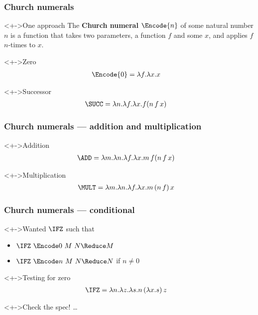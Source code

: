 \documentclass[pdftex,aspectratio=169]{beamer}
\begin{document}
\begin{frame}[fragile]
  \frametitle{Church numerals}
\begin{exampleblock}<+->{One approach}
  The \textbf{Church numeral}
  $\Encode{ n}$ of some natural number $n$ is a function that takes
  two parameters, a function $f$ and some $x$, and applies $f$ $n$-times to $x$.
\end{exampleblock}
\begin{alertblock}<+->{Zero}\VSPBLS
  \begin{align*}
    \Encode{0} & = \lambda f. \lambda x. x
  \end{align*}
\end{alertblock}
\begin{alertblock}<+->{Successor}\VSPBLS
  \begin{align*}
    \SUCC & = \lambda n. \lambda f. \lambda x. f (n\, f\,x)
  \end{align*}
\end{alertblock}
\end{frame}

\begin{frame}[fragile]
  \frametitle{Church numerals --- addition and multiplication}
\begin{alertblock}<+->{Addition}\VSPBLS
  \begin{align*}
    \ADD & = \lambda m. \lambda n. \lambda f. \lambda x. m\, f (n\, f\, x)
  \end{align*}
\end{alertblock}
\begin{alertblock}<+->{Multiplication}\VSPBLS
  \begin{align*}
    \MULT & = \lambda m . \lambda n. \lambda f. \lambda x. m\, (n\, f)\, x
  \end{align*}
\end{alertblock}
\end{frame}

\begin{frame}[fragile]
  \frametitle{Church numerals --- conditional}
  \begin{exampleblock}<+->{Wanted}
    $\IFZ$ such that
    \begin{itemize}
    \item $\IFZ~\Encode 0~M~N \Reduce M$
    \item $\IFZ~\Encode n~M~N \Reduce N$ if $n\ne 0$
    \end{itemize}
  \end{exampleblock}
  \begin{alertblock}<+->{Testing for zero}\VSPBLS
    \begin{align*}
      \IFZ &= \lambda n. \lambda z. \lambda s. n\,(\lambda x. s)\,z
    \end{align*}
  \end{alertblock}
  \begin{alertblock}<+->{Check the spec!}
    \dots
  \end{alertblock}
\end{frame}
\end{document}
